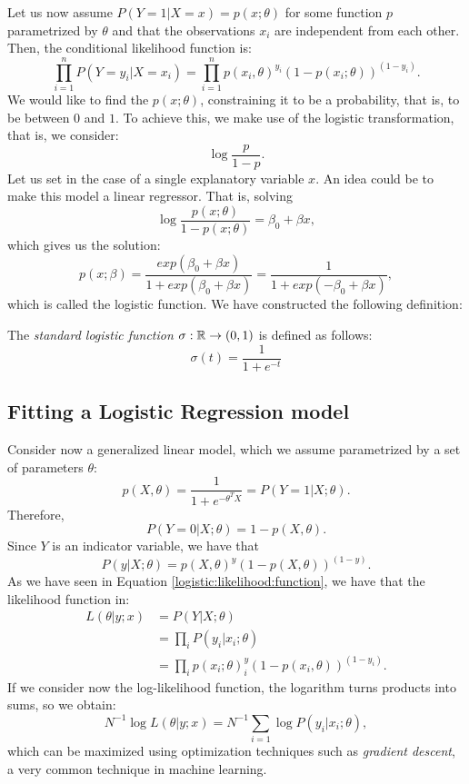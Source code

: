 Let us now assume $P(Y = 1| X = x) = p(x;\theta)$ for some function $p$ parametrized by $\theta$ and that the observations $x_i$ are independent from each other. Then, the conditional likelihood function is:
\begin{equation}\label{logistic:likelihood:function}
\prod_{i=1}^n P(Y = y_i | X = x_i) = \prod_{i=1}^n p(x_i,\theta)^{y_i} \left(1-p(x_i;\theta)\right)^{(1-y_i)}.    
\end{equation}
We would like to find the $p(x;\theta)$, constraining it to be a probability, that is, to be between $0$ and $1$. To achieve this, we make use of the logistic transformation, that is, we consider:
\[
\log\frac{p}{1-p}.   
\]
Let us set in the case of a single explanatory variable $x$. An idea could be to make this model a linear regressor. That is, solving
\[
\log\frac{p(x;\theta)}{1-p(x;\theta)} = \beta_0 + \beta x , 
\]
which gives us the solution:
\[
p(x;\beta) = \frac{exp(\beta_0 +  \beta x)}{1 + exp(\beta_0 +  \beta x)} = \frac{1}{1 + exp\left( - \beta_0 + \beta x\right)},
\]
which is called the logistic function. We have constructed the following definition:
\begin{ndef}
The \emph{standard logistic function} $\sigma: \mathbb{R} \to (0,1)$ is defined as follows:
\[
\sigma(t) = \frac{1}{1+e^{-t}}
\]
\end{ndef}

\subsection{Fitting a Logistic Regression model}

Consider now a generalized linear model, which we assume parametrized by a set of parameters $\theta$:
\[
p(X,\theta) = \frac{1}{1+e^{-\theta^T X}} = P(Y = 1 |X; \theta).    
\]
Therefore, 
\[
P(Y = 0 | X ; \theta) = 1- p(X,\theta). 
\]
Since $Y$ is an indicator variable, we have that
\[
P(y|X;\theta) = p(X,\theta)^y(1-p(X,\theta))^{(1-y)}.
\]
As we have seen in Equation \eqref{logistic:likelihood:function}, we have that the likelihood function in:
\begin{align*}
L(\theta|y;x) & = P(Y|X;\theta) \\
& =\prod_i P(y_i|x_i;\theta) \\
& =  \prod_i p(x_i;\theta)^y_i (1- p(x_i,\theta))^{(1-y_i)}.    
\end{align*}
If we consider now the log-likelihood function, the logarithm turns products into sums, so we obtain:
\[
N^{-1}\log L(\theta|y;x) = N^{-1} \sum_{i=1} \log P(y_i | x_i;\theta),
\]
which can be maximized using optimization techniques such as \emph{gradient descent}, a very common technique in machine learning.


